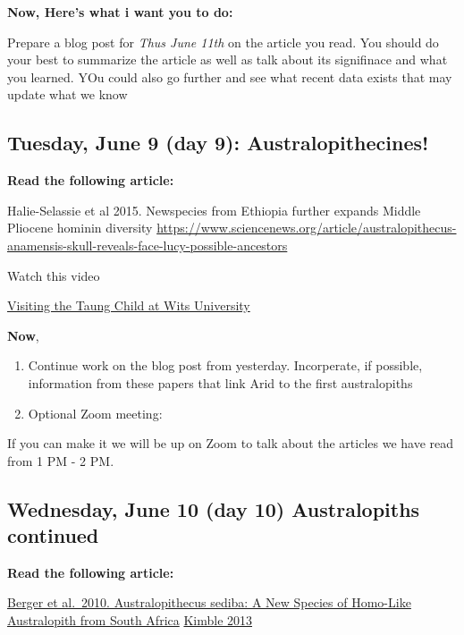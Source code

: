 \documentclass[]{tufte-handout}
\begin{document}
\textbf{Now, Here's what i want you to do:}

Prepare a blog post for \emph{Thus June 11th} on the article you read.
You should do your best to summarize the article as well as talk about
its signifinace and what you learned. YOu could also go further and see
what recent data exists that may update what we know

\hypertarget{tuesday-june-9-day-9-australopithecines}{%
\subsection{Tuesday, June 9 (day 9):
Australopithecines!}\label{tuesday-june-9-day-9-australopithecines}}

\textbf{Read the following article:}

Halie-Selassie et al 2015. Newspecies from Ethiopia further expands
Middle Pliocene hominin diversity
\url{https://www.sciencenews.org/article/australopithecus-anamensis-skull-reveals-face-lucy-possible-ancestors}

Watch this video

\href{https://www.youtube.com/watch?v=0mWOJ56_Et0}{Visiting the Taung
Child at Wits University}

\textbf{Now},

\begin{enumerate}
\def\labelenumi{\arabic{enumi}.}
\item
  Continue work on the blog post from yesterday. Incorperate, if
  possible, information from these papers that link Arid to the first
  australopiths
\item
  Optional Zoom meeting:
\end{enumerate}

If you can make it we will be up on Zoom to talk about the articles we
have read from 1 PM - 2 PM.

\hypertarget{wednesday-june-10-day-10-australopiths-continued}{%
\subsection{Wednesday, June 10 (day 10) Australopiths
continued}\label{wednesday-june-10-day-10-australopiths-continued}}

\textbf{Read the following article:}

\href{https://www.academia.edu/1586502/Australopithecus_sediba_A_New_Species_of_Homo-Like_Australopith_from_South_Africa}{Berger
et al.~2010. Australopithecus sediba: A New Species of Homo-Like
Australopith from South Africa}
\href{Hesitation\%20on\%20hominin\%20history}{Kimble 2013}
\end{document}
